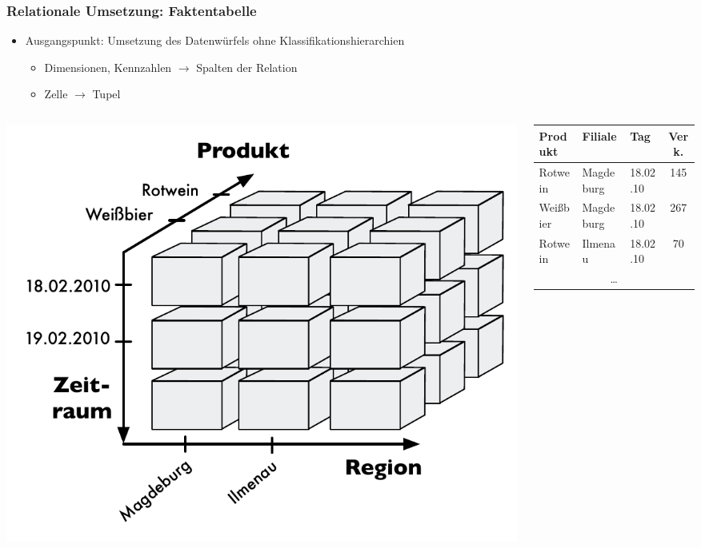         
            \begin{frame}
        
            \frametitle{Relationale Umsetzung: Faktentabelle}
            \begin{itemize}
            \item Ausgangspunkt: Umsetzung des Datenwürfels ohne
              Klassifikationshierarchien
              \begin{itemize}
              \item Dimensionen, Kennzahlen $\to$ Spalten der Relation
              \item Zelle $\to$ Tupel
              \end{itemize}
            \end{itemize}
        
            \begin{columns}[c]
            \begin{column}{3.5cm}
              \includegraphics[width = 1.3\textwidth]{fig6/Faktentabelle.pdf}
            \end{column}
            \begin{column}{5cm}
            {\scriptsize
            \begin{tabular}{|l|l|l|c|}
            \hline
            \rowcolor{Gray}  Produkt & Filiale & Tag & Verk. \\
            \hline
            \hline
            Rotwein & Magdeburg & 18.02.10 & 145 \\
            Weißbier & Magdeburg & 18.02.10 & 267 \\
            Rotwein & Ilmenau & 18.02.10 & 70 \\
            \multicolumn{4}{|c|}{\dots}\\
            \hline
            \end{tabular}
            }
            \end{column}
            \end{columns}
            \end{frame}
        
